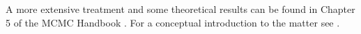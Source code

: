 A more extensive treatment and some theoretical results can be found in Chapter 5 of the MCMC Handbook \cite{brooks_mcmc_2011}. For a conceptual introduction to the matter see \cite{betancourt_conceptual_2017}.


%	
%
%
%	
%		
%		
